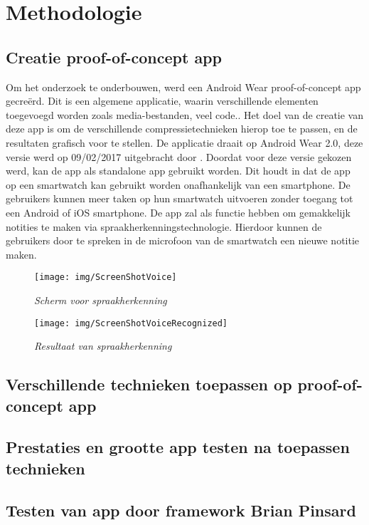 
\chapter{Methodologie}
\label{ch:methodologie}


\section{Creatie proof-of-concept app}
\label{sec:proofofconcept}

Om het onderzoek te onderbouwen, werd een Android Wear proof-of-concept app gecreërd. Dit is een algemene applicatie, waarin verschillende elementen toegevoegd worden zoals media-bestanden, veel code.. Het doel van de creatie van deze app is om de verschillende compressietechnieken hierop toe te passen, en de resultaten grafisch voor te stellen. De applicatie draait op Android Wear 2.0, deze versie werd op 09/02/2017 uitgebracht door \textcite{Google} . Doordat voor deze versie gekozen werd, kan de app als standalone app gebruikt worden. Dit houdt in dat de app op een smartwatch kan gebruikt worden onafhankelijk van een smartphone. De gebruikers kunnen meer taken op hun smartwatch uitvoeren zonder toegang tot een Android of iOS smartphone. De app zal als functie hebben om gemakkelijk notities te maken via spraakherkenningstechnologie. Hierdoor kunnen de gebruikers door te spreken in de microfoon van de smartwatch een nieuwe notitie maken. 
\begin{figure}[H]
	\centering
	\caption{\textit{Scherm voor spraakherkenning}}
	\texttt{[image: img/ScreenShotVoice]}\\[.5cm]
\end{figure}
\begin{figure}[H]
	\centering
	\caption{\textit{Resultaat van spraakherkenning}}
	\texttt{[image: img/ScreenShotVoiceRecognized]}\\[.5cm]
	
\end{figure}
\section{Verschillende technieken toepassen op proof-of-concept app}
\label{sec:techniekentoepassen}


\section{Prestaties en grootte app testen na toepassen technieken}
\label{sec:prestatiesgrootteapp}

\section{Testen van app door framework Brian Pinsard}
\label{sec:apptesting}